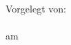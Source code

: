 \makeatletter

\begin{titlepage}

    \pagestyle{plain}
    \thispagestyle{empty}
    \begin{center}
        
        \LARGE{\textsc{
            \@institute \vspace{0.5cm}\\
            \@titleinfoA \vspace{0.5cm}\\
            \@titleinfoB
        }}
        \vfill
        
        \huge{\textbf{\@title}}
        \vspace{4mm}
        
        \normalsize{\textbf{\@subtitle}}
        \vspace{8mm}
    \end{center}
    \vfill%
    Vorgelegt von:\\
    \@author\\
    am \@submitdate\\
    \@firstSupervisor
    
    \vfill%

\end{titlepage}
\makeatother
